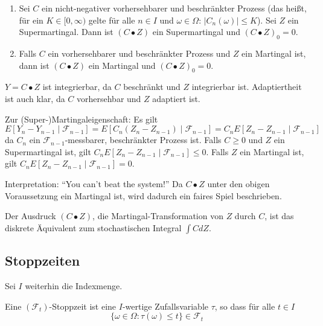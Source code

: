 \documentclass[a4paper,twoside,DIV15,BCOR12mm]{scrbook}
\newcommand{\cF}{\mathcal F}
\newcommand{\dickerkringel}{\bullet}
\begin{document}
\begin{satz}
\begin{enumerate}
\item Sei $C$ ein nicht-negativer vorhersehbarer und beschränkter Prozess (das heißt, für ein $K\in[0,\infty)$ gelte für alle $n\in I$ und $\omega\in\Omega$: $|C_n(\omega)|\le K$). Sei $Z$ ein Supermartingal. Dann ist $(C\dickerkringel Z)$ ein Supermartingal und $(C\dickerkringel Z)_0=0$.
\item Falls $C$ ein vorhersehbarer und beschränkter Prozess und $Z$ ein Martingal ist, dann ist $(C\dickerkringel Z)$ ein Martingal und $(C\dickerkringel Z)_0=0$.
\end{enumerate}
\end{satz}

\begin{beweis}
$Y=C\dickerkringel Z$ ist integrierbar, da $C$ beschränkt und $Z$ integrierbar ist. Adaptiertheit ist auch klar, da $C$ vorhersehbar und $Z$ adaptiert ist.

Zur (Super-)Martingaleigenschaft: Es gilt
\[
E[Y_n - Y_{n-1}\mid \cF_{n-1}] = E[C_n( Z_n - Z_{n-1})\mid \cF_{n-1}] = C_n E[Z_n - Z_{n-1}\mid \cF_{n-1}]
\]
da $C_n$ ein $\cF_{n-1}$-messbarer, beschränkter Prozess ist. Falls $C\ge 0$ und $Z$ ein Supermartingal ist, gilt $C_n E[Z_n - Z_{n-1}\mid \cF_{n-1}] \le 0$. Falls $Z$ ein Martingal ist, gilt $C_n E[Z_n - Z_{n-1}\mid \cF_{n-1}] = 0$.
\end{beweis}

Interpretation: “You can’t beat the system!” Da $C\bullet Z$ unter den obigen Voraussetzung ein Martingal ist, wird dadurch ein faires Spiel beschrieben. 

\begin{bemerkung}
Der Ausdruck $(C\bullet Z)$, die Martingal-Transformation von $Z$ durch $C$, ist das diskrete Äquivalent zum stochastischen Integral $\int C d Z$.
\end{bemerkung}

\subsection{Stoppzeiten}

Sei $I$ weiterhin die Indexmenge.

\begin{definition}
Eine $(\cF_t)$-Stoppzeit ist eine $I$-wertige Zufallsvariable $\tau$, so dass für alle $t\in I$
\[
\{\omega\in\Omega: \tau(\omega)\le t\}\in\cF_t
\]
\end{definition}
\end{document}
